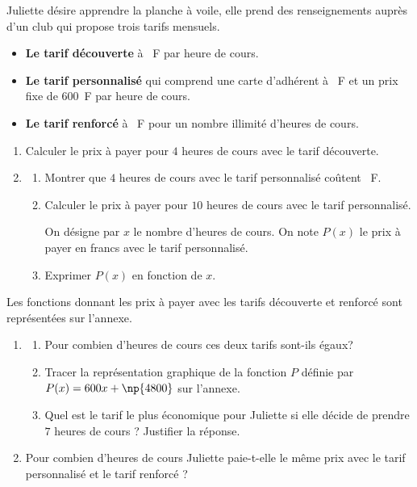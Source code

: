 \documentclass[exercice,a4]{thedocument}%
\begin{document}
%

\medskip

Juliette désire apprendre la planche à voile, elle prend des renseignements auprès d'un club qui propose trois tarifs mensuels.

\begin{itemize}
\item[$\bullet~~$] \textbf{Le tarif découverte} à ~F par heure de cours.
\item[$\bullet~~$] \textbf{Le tarif personnalisé} qui comprend une carte d'adhérent à ~F et un prix fixe de $600$~F par heure de cours.
\item[$\bullet~~$] \textbf{Le tarif renforcé} à ~F pour un nombre illimité d'heures de cours.
\end{itemize}

\medskip

\begin{enumerate}
\item Calculer le prix à payer pour $4$ heures de cours avec le tarif découverte.
\item
	\begin{enumerate}
		\item Montrer que $4$ heures de cours avec le tarif personnalisé coûtent ~F.
		\item Calculer le prix à payer pour $10$ heures de cours avec le tarif personnalisé.

On désigne par $x$ le nombre d'heures de cours. On note $P(x)$ le prix à payer en francs avec le tarif personnalisé.
		\item Exprimer $P(x)$ en fonction de $x$.
	\end{enumerate}
\end{enumerate}

Les fonctions donnant les prix à payer avec les tarifs découverte et renforcé sont représentées sur l'annexe.

\begin{enumerate}[resume]
\item
	\begin{enumerate}
		\item Pour combien d'heures de cours ces deux tarifs sont-ils égaux?
		\item Tracer la représentation graphique de la fonction $P$ définie par $P(x) = 600x + \np{4800}$ sur l'annexe.
		\item Quel est le tarif le plus économique pour Juliette si elle décide de prendre $7$ heures de cours ? Justifier la réponse.
	\end{enumerate}
\item Pour combien d'heures de cours Juliette paie-t-elle le même prix avec le tarif personnalisé et le tarif renforcé ?
\end{enumerate}
\end{document}
